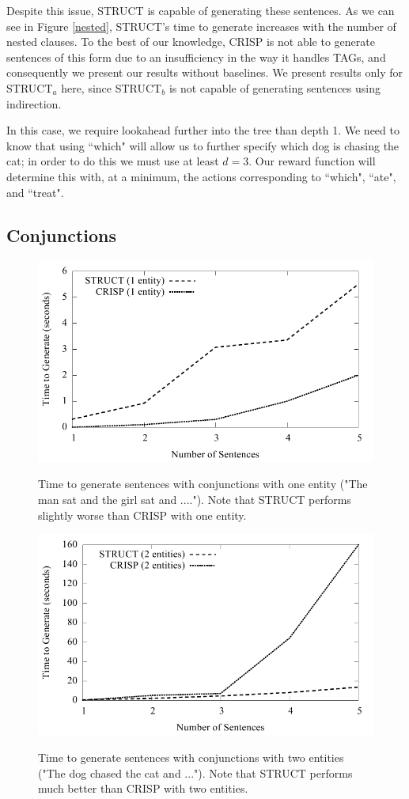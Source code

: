 Despite this issue, STRUCT is capable of generating these sentences.  As we can
see in Figure \ref{nested}, STRUCT's time to generate increases with the number of
nested clauses.  To the best of our knowledge, CRISP is not able to generate sentences
of this form due to an insufficiency in the way it handles TAGs,
and consequently we present our results without baselines.  We present
results only for STRUCT$_a$ here, since STRUCT$_b$ is not capable of generating
sentences using indirection.

In this case, we require lookahead further into the tree than depth 1.  We need to know
that using ``which" will allow us to further specify which dog is chasing the cat;
in order to do this we must use at least $d=3$.  Our reward function will determine this
with, at a minimum, the actions corresponding to ``which", ``ate", and ``treat".

\subsection{Conjunctions}

\begin{figure}
\centering
\includegraphics[width=0.7 \linewidth]{../analysis/struct/conjunction/conjunction1.pdf}
\label{graph-conjunction1}
\caption{Time to generate sentences with conjunctions with one entity ("The man sat and the girl sat and ....").
Note that STRUCT performs slightly worse than CRISP with one entity.}
\end{figure}

\begin{figure}
\centering
\includegraphics[width=0.7 \linewidth]{../analysis/struct/conjunction/conjunction2.pdf}
\label{graph-conjunction2}
\caption{Time to generate sentences with conjunctions with two entities ("The dog chased the cat and ...").  Note that
STRUCT performs much better than CRISP with two entities.}
\end{figure}

